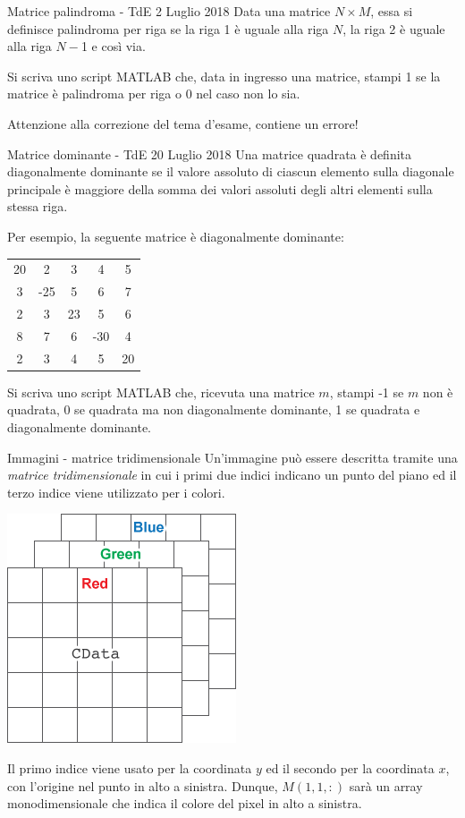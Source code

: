 \documentclass[aspectratio=169]{beamer}
\begin{document}
\begin{frame}{Matrice palindroma - TdE 2 Luglio 2018}
Data una matrice $N \times M$, essa si definisce palindroma per riga se la riga 1 è uguale alla riga $N$, la riga 2 è uguale alla riga $N-­$1 e così via.

Si scriva uno script MATLAB che, data in ingresso una matrice, stampi 1 se la matrice è palindroma per riga o 0 nel caso non lo sia.

Attenzione alla correzione del tema d'esame, contiene un errore!
\end{frame}

\begin{frame}{Matrice dominante - TdE 20 Luglio 2018}
Una matrice quadrata è definita diagonalmente dominante se il valore assoluto di ciascun elemento sulla
diagonale principale è maggiore della somma dei valori assoluti degli altri elementi sulla stessa riga.

Per esempio, la seguente matrice è diagonalmente dominante:
\begin{tabular}{ccccc}
	20 & 2 & 3 & 4 & 5 \\
	3 & -25 & 5 & 6 & 7 \\
	2 & 3 & 23 & 5 & 6 \\
	8 & 7 & 6 & -30 & 4 \\
	2 & 3 & 4 & 5 & 20 \\
\end{tabular}

Si scriva uno script MATLAB che, ricevuta una matrice $m$, stampi -1 se $m$ non è quadrata, 0 se quadrata ma non diagonalmente dominante, 1 se quadrata e diagonalmente dominante.
\end{frame}

\begin{frame}{Immagini - matrice tridimensionale}
Un'immagine può essere descritta tramite una \emph{matrice tridimensionale} in cui i primi due indici indicano un punto del piano ed il terzo indice viene utilizzato per i colori.

\begin{center}
\includegraphics[width=0.2\linewidth]{./matrice_immagine.png}
\end{center}

Il primo indice viene usato per la coordinata $y$ ed il secondo per la coordinata $x$, con l'origine nel punto in alto a sinistra.
Dunque, $M(1,1,:)$ sarà un array monodimensionale che indica il colore del pixel in alto a sinistra.
\end{frame}
\end{document}
